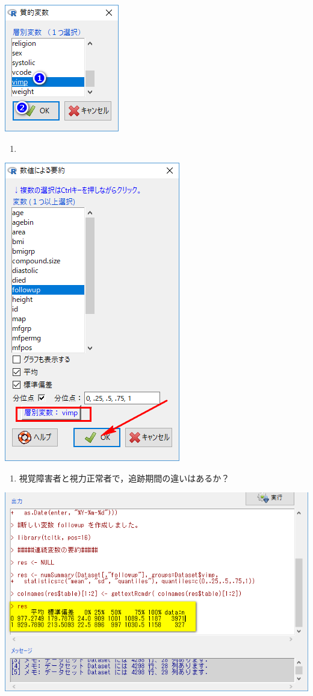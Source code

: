 \documentclass[11pt,]{problemset}
\providecommand{\tightlist}{%
  \setlength{\itemsep}{0pt}\setlength{\parskip}{0pt}}
\begin{document}
\begin{center}\includegraphics[width=0.25\linewidth,height=0.35\textheight]{pic/survival0901} \end{center}

\begin{enumerate}
\def\labelenumi{\arabic{enumi}.}
\setcounter{enumi}{8}
\item
\end{enumerate}

\begin{center}\includegraphics[width=0.45\linewidth,height=0.35\textheight]{pic/survival0902} \end{center}

\begin{enumerate}
\def\labelenumi{\arabic{enumi}.}
\setcounter{enumi}{9}
\tightlist
\item
  視覚障害者と視力正常者で，追跡期間の違いはあるか？
\end{enumerate}

\begin{center}\includegraphics[width=0.55\linewidth,height=0.35\textheight]{pic/survival0903} \end{center}
\end{document}
